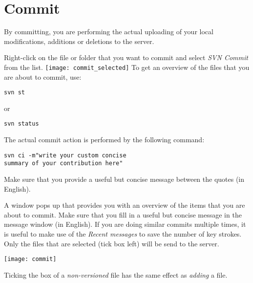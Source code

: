 \section{Commit}
By committing, you are performing the actual uploading of your local modifications, additions or deletions to the server.

\begin{multicols}{2}
Right-click on the file or folder that you want to commit and select \emph{SVN Commit} from the list. 
\newline
\newline
\texttt{[image: commit\_selected]}
\columnbreak %
\newline To get an overview of the files that you are about to commit, use:
\begin{verbatim}
svn st
\end{verbatim}
or
\begin{verbatim}
svn status
\end{verbatim}
The actual commit action is performed by the following command:
\begin{verbatim}
svn ci -m"write your custom concise 
summary of your contribution here"
\end{verbatim}
Make sure that you provide a useful but concise message between the quotes (in English). 
\end{multicols}

\begin{multicols}{2}
A window pops up that provides you with an overview of the items that you are about to commit. Make sure that you fill in a useful but concise message in the message window (in English). If you are doing similar commits multiple times, it is useful to make use of the \emph{Recent messages} to save the number of key strokes. Only the files that are selected (tick box left) will be send to the server. 
\columnbreak
\ \
\newline %
\newline
\newline
\ \ 
\end{multicols}
\begin{multicols}{2}
\texttt{[image: commit]}
\end{multicols}
\begin{multicols}{2}
Ticking the box of a \emph{non-versioned} file has the same effect as \emph{adding} a file. 
\ \ 
\newline
\ \
\end{multicols}

